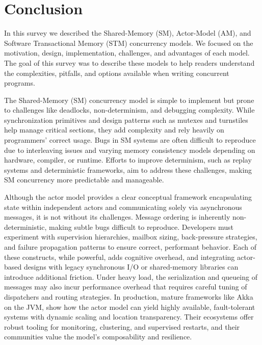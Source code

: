 \section{Conclusion\label{sec:conclusion}}
In this survey we described the Shared-Memory (SM),
Actor-Model (AM), and Software Transactional Memory (STM)
concurrency models. We focused on
the motivation, design, implementation, challenges,
and advantages of each model. The goal of this survey
was to describe these models to help readers
understand the complexities, pitfalls, and options
available when writing concurrent programs.

The Shared-Memory (SM) concurrency model
is simple to implement but prone to challenges like deadlocks,
non-determinism, and debugging complexity.
While synchronization primitives and design patterns
such as mutexes and turnstiles help manage critical sections,
they add complexity and rely heavily on programmers' correct usage.
Bugs in SM systems are often difficult to reproduce due to
interleaving issues and varying memory consistency models
depending on hardware, compiler, or runtime.
Efforts to improve determinism, such as replay systems and
deterministic frameworks, aim to address these challenges,
making SM concurrency more predictable and manageable.

Although the actor model provides a clear conceptual framework encapsulating state 
within independent actors and communicating solely via asynchronous messages, 
it is not without its challenges. Message ordering is inherently 
non-deterministic, making subtle bugs difficult to reproduce. 
Developers must experiment with supervision hierarchies, 
mailbox sizing, back-pressure strategies, and failure propagation 
patterns to ensure correct, performant behavior. Each of these 
constructs, while powerful, adds cognitive overhead, and integrating 
actor-based designs with legacy synchronous I/O or shared-memory libraries 
can introduce additional friction. Under heavy load, the serialization and 
queueing of messages may also incur performance overhead that requires careful 
tuning of dispatchers and routing strategies. In production, mature frameworks 
like Akka on the JVM, show how the actor model can yield highly available, 
fault-tolerant systems with dynamic scaling and location transparency. Their 
ecosystems offer robust tooling for monitoring, clustering, and supervised 
restarts, and their communities value the model’s composability and resilience.

